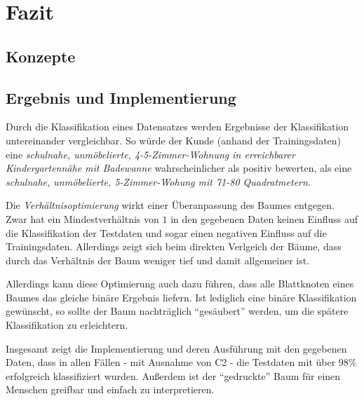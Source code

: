 \section{Fazit}\label{sec:fazit}
\subsection{Konzepte}


\subsection{Ergebnis und Implementierung}

Durch die Klassifikation eines Datensatzes werden Ergebnisse der Klassifikation untereinander vergleichbar.
So würde der Kunde (anhand der Trainingsdaten) eine  \emph{schulnahe, unmöbelierte, 4-5-Zimmer-Wohnung in erreichbarer Kindergartennähe mit Badewanne} wahrscheinlicher als positiv bewerten,
als eine \emph{schulnahe, unmöbelierte, 5-Zimmer-Wohung mit 71-80 Quadratmetern}.

Die \emph{Verhältnisoptimierung} wirkt einer Überanpassung des Baumes entgegen.
Zwar hat ein Mindestverhältnis von $1$ in den gegebenen Daten keinen Einfluss auf die Klassifikation der Testdaten und sogar einen negativen Einfluss auf die Trainingsdaten.
Allerdings zeigt sich beim direkten Verlgeich der Bäume,
dass durch das Verhältnis der Baum weniger tief und damit allgemeiner ist.

Allerdings kann diese Optimierung auch dazu führen,
dass alle Blattknoten eines Baumes das gleiche binäre Ergebnis liefern.
Ist lediglich eine binäre Klassifikation gewünscht,
so sollte der Baum nachträglich \enquote{gesäubert} werden,
um die spätere Klassifikation zu erleichtern.

Insgesamt zeigt die Implementierung und deren Ausführung mit den gegebenen Daten,
dass in allen Fällen - mit Ausnahme von C2 - die Testdaten mit über $98\%$ erfolgreich klassifiziert wurden.
Außerdem ist der \enquote{gedruckte} Baum für einen Menschen greifbar und einfach zu interpretieren.